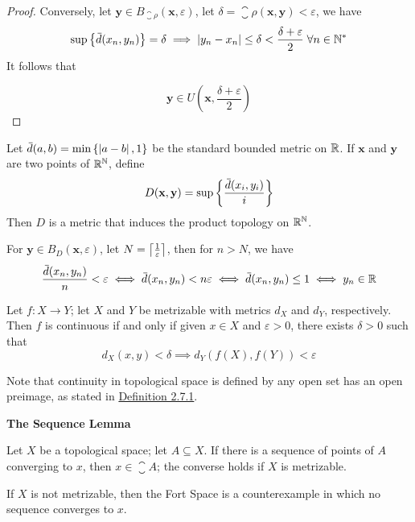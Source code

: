\documentclass[12pt,a4paper]{article}
\begin{document}
\begin{ex}
\begin{enumerate}[label=(\alph*)]
\begin{proof}
                Conversely, let $\mathbf{y}\in B_{\closure{\rho}}(\mathbf{x},\varepsilon)$, let $\delta=\closure{\rho}(\mathbf{x},\mathbf{y})<\varepsilon$, we have
                $$
                \sup\left\{{}\mkern3mu\overline{\mkern-3mud}(x_n,y_n)\right\}=\delta\implies \left\lvert y_n-x_n\right\rvert\leq\delta<\frac{\delta+\varepsilon}{2}\;\forall n\in\mathbb{N}^*
                $$
                It follows that
                
                $$\mathbf{y}\in U\left(\mathbf{x},\frac{\delta+\varepsilon}{2}\right)$$
            \end{proof}
        \end{enumerate}
    \end{ex}
    \hfill

    \begin{thm}\label{2.9.15}
        Let ${}\mkern3mu\overline{\mkern-3mud}(a,b)=\min\left\{\left\lvert a-b\right\rvert,1\right\}$ be the standard bounded metric on $\mathbb{R}$. If $\mathbf{x}$ and $\mathbf{y}$ are two points of $\mathbb{R}^{\mathbb{N}}$, define
        $$
        D(\mathbf{x},\mathbf{y})=\sup\left\{\frac{{}\mkern3mu\overline{\mkern-3mud}(x_i,y_i)}{i}\right\}
        $$
        Then $D$ is a metric that induces the product topology on $\mathbb{R}^{\mathbb{N}}$. 
    \end{thm}
    \begin{remark}
        For $\mathbf{y}\in B_{D}(\mathbf{x},\varepsilon)$, let $N=\left\lceil \frac{1}{\varepsilon}\right\rceil$, then for $n>N$, we have
        $$
        \frac{{}\mkern3mu\overline{\mkern-3mud}(x_n,y_n)}{n}<\varepsilon\iff {}\mkern3mu\overline{\mkern-3mud}(x_n,y_n)<n\varepsilon\iff {}\mkern3mu\overline{\mkern-3mud}(x_n,y_n)\leq1\iff y_n\in\mathbb{R}
        $$
    \end{remark}
    \hfill

    \begin{thm}\label{2.9.16}
        Let $f:X\to Y$; let $X$ and $Y$ be metrizable with metrics $d_X$ and $d_Y$, respectively. Then $f$ is continuous if and only if given $x\in X$ and $\varepsilon>0$, there exists $\delta>0$ such that
        $$
        d_X(x,y)<\delta\implies d_{Y}(f(X),f(Y))<\varepsilon
        $$
    \end{thm}
    \begin{remark}
        Note that continuity in topological space is defined by any open set has an open preimage, as stated in \hyperref[2.7.1]{Definition 2.7.1}.
    \end{remark}
    \hfill

    \begin{lemma}\textbf{The Sequence Lemma}\hfill

        Let $X$ be a topological space; let $A\subseteq X$. If there is a sequence of points of $A$ converging to $x$, then $x\in\closure{A}$; the converse holds if $X$ is metrizable.
    \end{lemma}
    \begin{remark}
        If $X$ is not metrizable, then the Fort Space is a counterexample in which no sequence converges to $x$.
    \end{remark}
    \hfill
\end{document}
